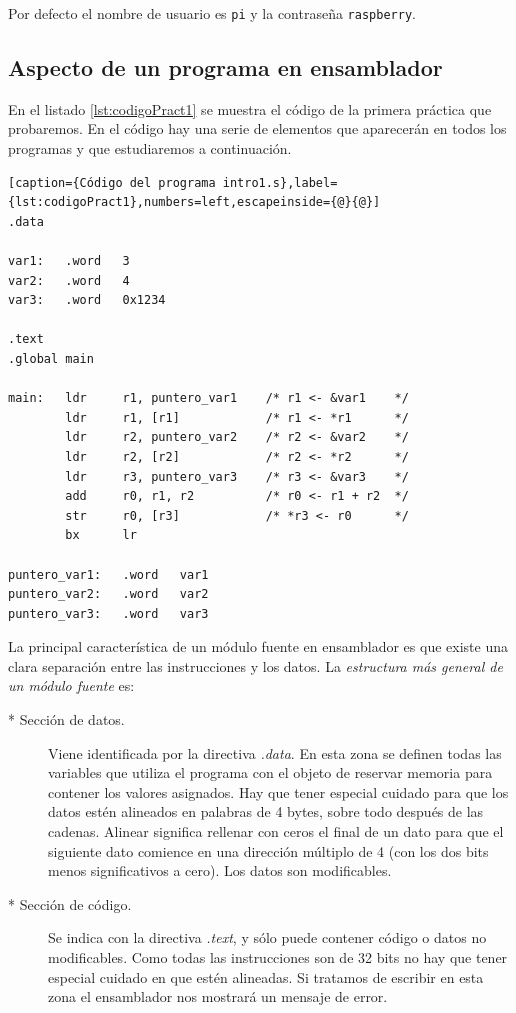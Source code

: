 Por defecto el nombre de usuario es {\tt pi} y la contraseña {\tt raspberry}.

\subsection{Aspecto de un programa en ensamblador}

En el listado \ref{lst:codigoPract1} se muestra el código de la primera
práctica que probaremos. En el código hay una serie de elementos que
aparecerán en todos los programas y que estudiaremos a continuación.

\begin{lstlisting}[caption={Código del programa intro1.s},label={lst:codigoPract1},numbers=left,escapeinside={@}{@}]
.data

var1:   .word   3
var2:   .word   4
var3:   .word   0x1234

.text
.global main
 
main:   ldr     r1, puntero_var1    /* r1 <- &var1    */
        ldr     r1, [r1]            /* r1 <- *r1      */
        ldr     r2, puntero_var2    /* r2 <- &var2    */
        ldr     r2, [r2]            /* r2 <- *r2      */
        ldr     r3, puntero_var3    /* r3 <- &var3    */
        add     r0, r1, r2          /* r0 <- r1 + r2  */
        str     r0, [r3]            /* *r3 <- r0      */
        bx      lr

puntero_var1:   .word   var1
puntero_var2:   .word   var2
puntero_var3:   .word   var3
\end{lstlisting}

La principal característica de un módulo fuente en ensamblador es
que existe una clara separación entre las instrucciones y los
datos. La {\it estructura más general de un módulo fuente} es:

\begin{description}
     \item[* Sección de datos.] Viene identificada por la directiva {\it .data}.
En esta zona se definen todas las variables que utiliza el programa
con el objeto de reservar memoria para contener los valores asignados. Hay que
tener especial cuidado para que los datos estén alineados en palabras de 4 bytes,
sobre todo después de las cadenas. Alinear significa rellenar con ceros el final
de un dato para que el siguiente dato comience en una dirección múltiplo de 4 (con
los dos bits menos significativos a cero). Los datos son modificables.

     \item[* Sección de código.] Se indica con la directiva {\it .text}, y sólo
puede contener código o datos no modificables. Como todas las instrucciones son
de 32 bits no hay que tener especial cuidado en que estén alineadas. Si tratamos
de escribir en esta zona el ensamblador nos mostrará un mensaje de error.
\end{description}

